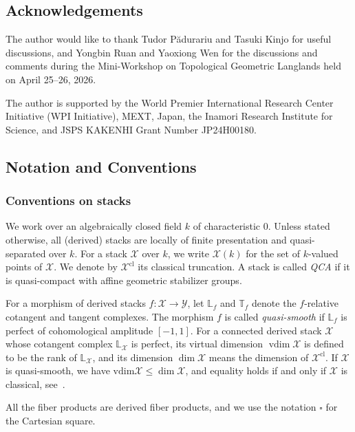 \documentclass[11pt,oneside,a4paper,mathscr]{amsart}
\theoremstyle{definition}
\renewcommand{\leq}{\leqslant}
\newcommand{\Y}{\mathcal{Y}}
\newcommand{\X}{\mathcal{X}}
\begin{document}
\subsection{Acknowledgements}
The author would like to thank Tudor P{\u a}durariu and Tasuki Kinjo
for useful discussions, and Yongbin Ruan and Yaoxiong Wen for the discussions and comments during
the Mini-Workshop on Topological Geometric Langlands held on
April 25--26, 2026.

The author is supported by the World Premier International Research
Center Initiative (WPI Initiative), MEXT, Japan, the Inamori Research
Institute for Science, and JSPS KAKENHI Grant Number JP24H00180.


 \subsection{Notation and Conventions}\label{subsec:notation0}
    \subsubsection*{Conventions on stacks}
We work over an algebraically closed field $k$ of characteristic $0$.
Unless stated otherwise, all (derived) stacks are locally of finite presentation and quasi-separated over $k$.
For a stack $\X$ over $k$, we write $\X(k)$ for the set of $k$-valued points of $\X$.
We denote by $\X^{\mathrm{cl}}$ its classical truncation. 
A stack is called \textit{QCA} if it is quasi-compact with affine geometric stabilizer groups.

For a morphism of derived stacks $f\colon \X \to \Y$, let $\mathbb{L}_{f}$ and $\mathbb{T}_{f}$ denote the $f$-relative cotangent and tangent complexes. The morphism $f$ is called \textit{quasi-smooth} if $\mathbb{L}_{f}$ is perfect of cohomological amplitude $[-1, 1]$.
For a connected derived stack $\mathcal{X}$ whose cotangent complex $\mathbb{L}_{\mathcal{X}}$ is perfect, 
its virtual dimension $\operatorname{vdim} \mathcal{X}$ is defined to be the rank of $\mathbb{L}_{\mathcal{X}}$, and 
its dimension $\dim \mathcal{X}$ means the dimension of $\mathcal{X}^{\mathrm{cl}}$. 
If $\mathcal{X}$ is quasi-smooth, we have $\mathrm{vdim}\mathcal{X} \leq \dim \mathcal{X}$, 
and equality holds if and only if $\mathcal{X}$ is classical, see~\cite[Proposition~1]{KhanClassicality}. 

All the fiber products are derived fiber products, and we use the notation $\square$ for the 
Cartesian square. 
\end{document}
